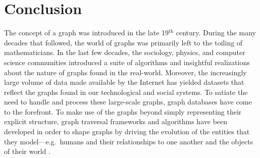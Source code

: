 \documentclass{svmult}
\begin{document}
\section{Conclusion}

The concept of a graph was introduced in the late 19$^\text{th}$ century. During the many decades that followed, the world of graphs was primarily left to the toiling of mathematicians. In the last few decades, the sociology, physics, and computer science communities introduced a suite of algorithms and insightful realizations about the nature of graphs found in the real-world. Moreover, the increasingly large volume of data made available by the Internet has yielded datasets that reflect the graphs found in our technological and social systems. To satiate the need to handle and process these large-scale graphs, graph databases have come to the forefront. To make use of the graphs beyond simply representing their explicit structure, graph traversal frameworks and algorithms have been developed in order to shape graphs by driving the evolution of the entities that they model---e.g.~humans and their relationships to one another and the objects of their world \cite{faith2:rodriguez2009}.



\end{document}
